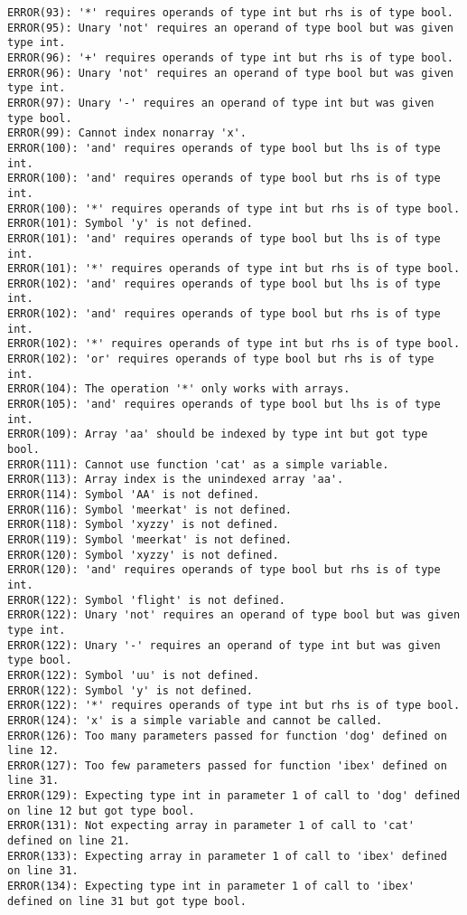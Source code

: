 \documentclass[12pt]{book}
\begin{document}
\begin{lstlisting}
ERROR(93): '*' requires operands of type int but rhs is of type bool.
ERROR(95): Unary 'not' requires an operand of type bool but was given type int.
ERROR(96): '+' requires operands of type int but rhs is of type bool.
ERROR(96): Unary 'not' requires an operand of type bool but was given type int.
ERROR(97): Unary '-' requires an operand of type int but was given type bool.
ERROR(99): Cannot index nonarray 'x'.
ERROR(100): 'and' requires operands of type bool but lhs is of type int.
ERROR(100): 'and' requires operands of type bool but rhs is of type int.
ERROR(100): '*' requires operands of type int but rhs is of type bool.
ERROR(101): Symbol 'y' is not defined.
ERROR(101): 'and' requires operands of type bool but lhs is of type int.
ERROR(101): '*' requires operands of type int but rhs is of type bool.
ERROR(102): 'and' requires operands of type bool but lhs is of type int.
ERROR(102): 'and' requires operands of type bool but rhs is of type int.
ERROR(102): '*' requires operands of type int but rhs is of type bool.
ERROR(102): 'or' requires operands of type bool but rhs is of type int.
ERROR(104): The operation '*' only works with arrays.
ERROR(105): 'and' requires operands of type bool but lhs is of type int.
ERROR(109): Array 'aa' should be indexed by type int but got type bool.
ERROR(111): Cannot use function 'cat' as a simple variable.
ERROR(113): Array index is the unindexed array 'aa'.
ERROR(114): Symbol 'AA' is not defined.
ERROR(116): Symbol 'meerkat' is not defined.
ERROR(118): Symbol 'xyzzy' is not defined.
ERROR(119): Symbol 'meerkat' is not defined.
ERROR(120): Symbol 'xyzzy' is not defined.
ERROR(120): 'and' requires operands of type bool but rhs is of type int.
ERROR(122): Symbol 'flight' is not defined.
ERROR(122): Unary 'not' requires an operand of type bool but was given type int.
ERROR(122): Unary '-' requires an operand of type int but was given type bool.
ERROR(122): Symbol 'uu' is not defined.
ERROR(122): Symbol 'y' is not defined.
ERROR(122): '*' requires operands of type int but rhs is of type bool.
ERROR(124): 'x' is a simple variable and cannot be called.
ERROR(126): Too many parameters passed for function 'dog' defined on line 12.
ERROR(127): Too few parameters passed for function 'ibex' defined on line 31.
ERROR(129): Expecting type int in parameter 1 of call to 'dog' defined on line 12 but got type bool.
ERROR(131): Not expecting array in parameter 1 of call to 'cat' defined on line 21.
ERROR(133): Expecting array in parameter 1 of call to 'ibex' defined on line 31.
ERROR(134): Expecting type int in parameter 1 of call to 'ibex' defined on line 31 but got type bool.

\end{lstlisting}
\end{document}
